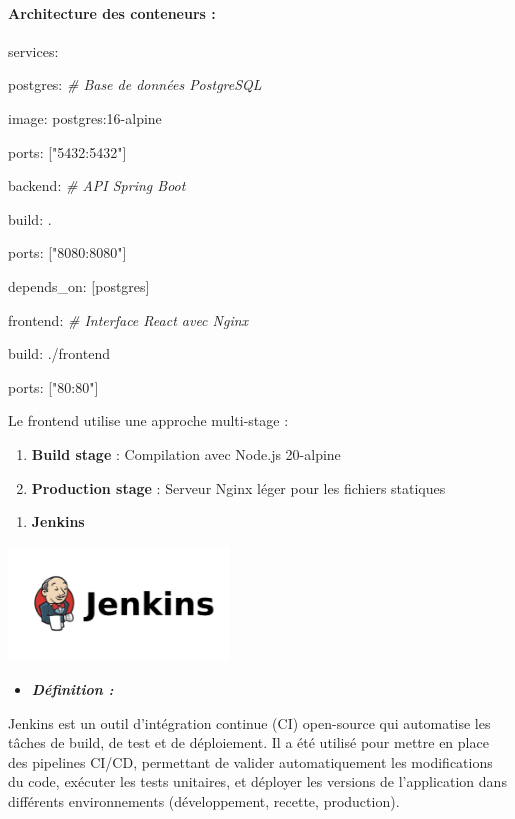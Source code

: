 \documentclass[12pt,a4paper,twoside]{report}
\begin{document}
\hypertarget{architecture-des-conteneurs}{%
\paragraph{Architecture des conteneurs
:}\label{architecture-des-conteneurs}}

services:

postgres: \emph{\# Base de données PostgreSQL}

image: postgres:16-alpine

ports: {[}"5432:5432"{]}

backend: \emph{\# API Spring Boot}

build: .

ports: {[}"8080:8080"{]}

depends\_on: {[}postgres{]}

frontend: \emph{\# Interface React avec Nginx}

build: ./frontend

ports: {[}"80:80"{]}

Le frontend utilise une approche multi-stage :

\begin{enumerate}
\def\labelenumi{\arabic{enumi}.}
\item
  \textbf{Build stage} : Compilation avec Node.js 20-alpine
\item
  \textbf{Production stage} : Serveur Nginx léger pour les fichiers
  statiques
\end{enumerate}

\begin{enumerate}
\def\labelenumi{\Alph{enumi}.}
\setcounter{enumi}{1}
\item
  \textbf{Jenkins}
\end{enumerate}

\includegraphics[width=2.30833in,height=1.20625in]{latex_media/media/image39.png}

\begin{itemize}
\item
  \emph{\textbf{Définition :}}
\end{itemize}

Jenkins est un outil d'intégration continue (CI) open-source qui
automatise les tâches de build, de test et de déploiement. Il a été
utilisé pour mettre en place des pipelines CI/CD, permettant de valider
automatiquement les modifications du code, exécuter les tests unitaires,
et déployer les versions de l'application dans différents environnements
(développement, recette, production).
\end{document}
